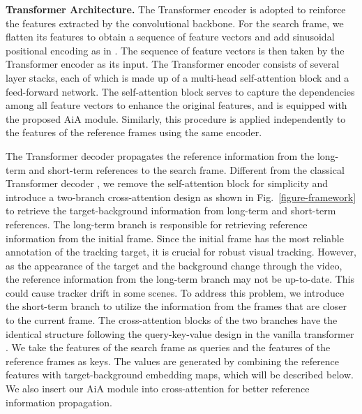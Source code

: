 \textbf{Transformer Architecture.} The Transformer encoder is adopted to reinforce the features extracted by the convolutional backbone. For the search frame, we flatten its features to obtain a sequence of feature vectors and add sinusoidal positional encoding as in \cite{carion2020end}. The sequence of feature vectors is then taken by the Transformer encoder as its input. The Transformer encoder consists of several layer stacks, each of which is made up of a multi-head self-attention block and a feed-forward network. The self-attention block serves to capture the dependencies among all feature vectors to enhance the original features, and is equipped with the proposed AiA module. Similarly, this procedure is applied independently to the features of the reference frames using the same encoder.

The Transformer decoder propagates the reference information from the long-term and short-term references to the search frame. Different from the classical Transformer decoder \cite{vaswani2017attention}, we remove the self-attention block for simplicity and introduce a two-branch cross-attention design as shown in Fig.~\ref{figure-framework} to retrieve the target-background information from long-term and short-term references. The long-term branch is responsible for retrieving reference information from the initial frame. Since the initial frame has the most reliable annotation of the tracking target, it is crucial for robust visual tracking. However, as the appearance of the target and the background change through the video, the reference information from the long-term branch may not be up-to-date. This could cause tracker drift in some scenes. To address this problem, we introduce the short-term branch to utilize the information from the frames that are closer to the current frame. The cross-attention blocks of the two branches have the identical structure following the query-key-value design in the vanilla transformer \cite{vaswani2017attention}. We take the features of the search frame as queries and the features of the reference frames as keys. The values are generated by combining the reference features with target-background embedding maps, which will be described below. We also insert our AiA module into cross-attention for better reference information propagation.

